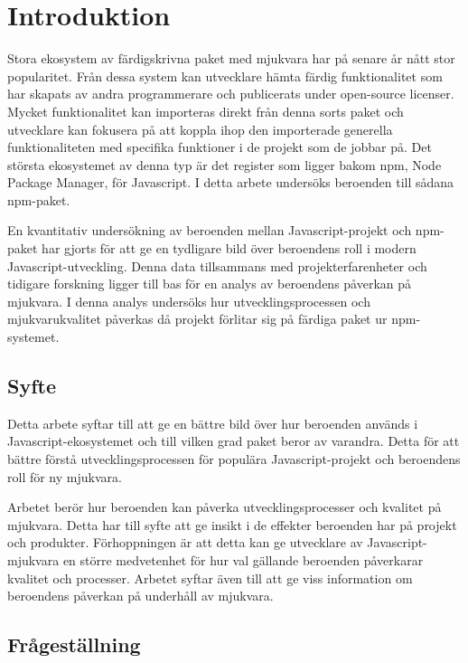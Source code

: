 \section{Introduktion}
\label{sec:joel_o-introduction}
Stora ekosystem av färdigskrivna paket med mjukvara har på senare år nått stor popularitet.\cite{Wittern:2016} Från dessa system kan utvecklare hämta färdig funktionalitet som har skapats av andra programmerare och publicerats under open-source licenser. Mycket funktionalitet kan importeras direkt från denna sorts paket och utvecklare kan fokusera på att koppla ihop den importerade generella funktionaliteten med specifika funktioner i de projekt som de jobbar på. Det största ekosystemet av denna typ är det register som ligger bakom npm, Node Package Manager, för Javascript.\cite{Decan2018} I detta arbete undersöks beroenden till sådana npm-paket.

En kvantitativ undersökning av beroenden mellan Javascript-projekt och npm-paket har gjorts för att ge en tydligare bild över beroendens roll i modern Javascript-utveckling. Denna data tillsammans med projekterfarenheter och tidigare forskning ligger till bas för en analys av beroendens påverkan på mjukvara. I denna analys undersöks hur utvecklingsprocessen och mjukvarukvalitet påverkas då projekt förlitar sig på färdiga paket ur npm-systemet.

\subsection{Syfte}
Detta arbete syftar till att ge en bättre bild över hur beroenden används i Javascript-ekosystemet och till vilken grad paket beror av varandra. Detta för att bättre förstå utvecklingsprocessen för populära Javascript-projekt och beroendens roll för ny mjukvara.

Arbetet berör hur beroenden kan påverka utvecklingsprocesser och kvalitet på mjukvara. Detta har till syfte att ge insikt i de effekter beroenden har på projekt och produkter. Förhoppningen är att detta kan ge utvecklare av Javascript-mjukvara en större medvetenhet för hur val gällande beroenden påverkarar kvalitet och processer. Arbetet syftar även till att ge viss information om beroendens påverkan på underhåll av mjukvara.

\subsection{Frågeställning}
\label{subsec:joel_o-research-questions}

